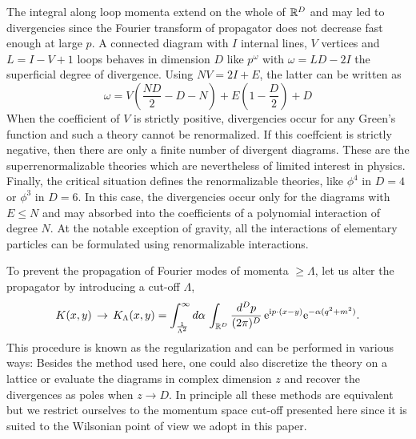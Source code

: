 \documentclass[12pt,here,feynmf]{article}
\begin{document}
The integral along loop momenta extend on the whole of ${{\Bbb R}^{D}}$ and may led to divergencies since the Fourier transform of propagator does not decrease fast enough at large $p$. A connected diagram with $I$ internal lines, $V$ vertices and $L=I-V+1$ loops behaves  in dimension $D$ like $p^{\omega}$ with $\omega=LD-2I$ the superficial degree of divergence. Using $NV=2I+E$, the latter can be written as 
\begin{equation}
\omega=V\left(\frac{ND}{2}-D-N\right)+E\left(1-\frac{D}{2}\right)+D
\end{equation}
When the coefficient of $V$ is strictly positive, divergencies occur for any Green's function and such a theory cannot be renormalized. If this coeffcient is strictly negative, then there are only a finite number of divergent diagrams. These are the superrenormalizable theories which are nevertheless of limited interest in physics. Finally, the critical situation defines the renormalizable theories, like $\phi^{4}$ in $D=4$ or $\phi^{3}$ in $D=6$. In this case, the divergencies occur only for the diagrams with $E\leq N$ and may absorbed into the coefficients of a polynomial  interaction of degree $N$. At the notable exception of gravity, all the interactions of elementary particles can be formulated using renormalizable interactions. 

To prevent the propagation of Fourier modes of momenta $\geq \Lambda$, let us alter the propagator by introducing a cut-off $\Lambda$,
\begin{equation} 
K(x,y)\,\rightarrow\,K_{\Lambda}(x,y)=\int_{\frac{1}{\Lambda^{2}}}^{\infty} d\alpha\,\int_{{\Bbb R}^{D}}\frac{d^{D}p}{(2\pi)^{D}}\,
\mathrm{e}^{\mathrm{i}p\cdot(x-y)}
\mathrm{e}^{-\alpha(q^{2}+m^{2})}
\label{propagator}.
\end{equation}
This procedure is known as the regularization and can be performed in various ways: Besides  the method used here, one could also discretize the theory on a lattice or evaluate the diagrams in complex dimension $z$ and recover the divergences as poles when $z\rightarrow D$. In principle all these methods are equivalent but we restrict ourselves to the momentum space  cut-off presented here since it is suited to the Wilsonian point of view we adopt in this paper.
\end{document}
